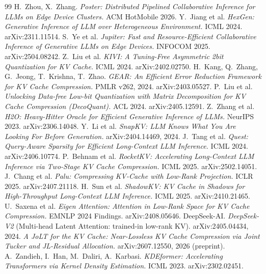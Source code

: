 \documentclass[11pt]{article}
\begin{document}
\begin{thebibliography}{99}
\small
 H.~Zhou, X.~Zhang. \emph{Poster: Distributed Pipelined Collaborative Inference for LLMs on Edge Device Clusters.} ACM HotMobile 2026.
 Y.~Jiang et al. \emph{HexGen: Generative Inference of LLM over Heterogeneous Environment.} ICML 2024. arXiv:2311.11514.
 S.~Ye et al. \emph{Jupiter: Fast and Resource-Efficient Collaborative Inference of Generative LLMs on Edge Devices.} INFOCOM 2025. arXiv:2504.08242.
 Z.~Liu et al. \emph{KIVI: A Tuning-Free Asymmetric 2bit Quantization for KV Cache.} ICML 2024. arXiv:2402.02750.
 H.~Kang, Q.~Zhang, G.~Jeong, T.~Krishna, T.~Zhao. \emph{GEAR: An Efficient Error Reduction Framework for KV Cache Compression.} PMLR v262, 2024. arXiv:2403.05527.
 P.~Liu et al. \emph{Unlocking Data-free Low-bit Quantization with Matrix Decomposition for KV Cache Compression (DecoQuant).} ACL 2024. arXiv:2405.12591.
 Z.~Zhang et al. \emph{H2O: Heavy-Hitter Oracle for Efficient Generative Inference of LLMs.} NeurIPS 2023. arXiv:2306.14048.
 Y.~Li et al. \emph{SnapKV: LLM Knows What You Are Looking For Before Generation.} arXiv:2404.14469, 2024.
 J.~Tang et al. \emph{Quest: Query-Aware Sparsity for Efficient Long-Context LLM Inference.} ICML 2024. arXiv:2406.10774.
 P.~Behnam et al. \emph{RocketKV: Accelerating Long-Context LLM Inference via Two-Stage KV Cache Compression.} ICML 2025. arXiv:2502.14051.
 J.~Chang et al. \emph{Palu: Compressing KV-Cache with Low-Rank Projection.} ICLR 2025. arXiv:2407.21118.
 H.~Sun et al. \emph{ShadowKV: KV Cache in Shadows for High-Throughput Long-Context LLM Inference.} ICML 2025. arXiv:2410.21465.
 U.~Saxena et al. \emph{Eigen Attention: Attention in Low-Rank Space for KV Cache Compression.} EMNLP 2024 Findings. arXiv:2408.05646.
 DeepSeek-AI. \emph{DeepSeek-V2} (Multi-head Latent Attention: trained-in low-rank KV). arXiv:2405.04434, 2024.
 \emph{A JoLT for the KV Cache: Near-Lossless KV Cache Compression via Joint Tucker and JL-Residual Allocation.} arXiv:2607.12550, 2026 (preprint).
 A.~Zandieh, I.~Han, M.~Daliri, A.~Karbasi. \emph{KDEformer: Accelerating Transformers via Kernel Density Estimation.} ICML 2023. arXiv:2302.02451.

\end{thebibliography}
\end{document}
